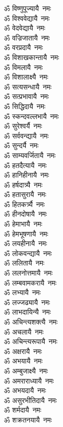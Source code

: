 \begin{flushleft}
\begin{multicols}{2}
ॐ विष्णुपूज्यायै~नमः\\
ॐ विश्ववेद्यायै~नमः\\
ॐ वेदवेद्यायै~नमः\\
ॐ वज्रिजातायै~नमः\\
ॐ वरप्रदायै~नमः\\
ॐ विशाखकान्तायै~नमः\\
ॐ विमलायै~नमः\\
ॐ विशालाक्ष्यै~नमः\\
ॐ सत्यसन्धायै~नमः\\
ॐ सत्प्रभावायै~नमः\hfill{}\\
ॐ सिद्धिदायै~नमः\\
ॐ स्कन्दवल्लभायै~नमः\\
ॐ सुरेश्वर्यै~नमः\\
ॐ सर्ववन्द्यायै~नमः\\
ॐ सुन्दर्यै~नमः\\
ॐ साम्यवर्जितायै~नमः\\
ॐ हतदैत्यायै~नमः\\
ॐ हानिहीनायै~नमः\\
ॐ हर्षदात्र्यै~नमः\\
ॐ हतासुरायै~नमः\hfill{}\\
ॐ हितकर्त्र्यै~नमः\\
ॐ हीनदोषायै~नमः\\
ॐ हेमाभायै~नमः\\
ॐ हेमभूषणायै~नमः\\
ॐ लयहीनायै~नमः\\
ॐ लोकवन्द्यायै~नमः\\
ॐ ललितायै~नमः\\
ॐ ललनोत्तमायै~नमः\\
ॐ लम्बवामकरायै~नमः\\
ॐ लभ्यायै~नमः\hfill{}\\
ॐ लज्जढ्यायै~नमः\\
ॐ लाभदायिन्यै~नमः\\
ॐ अचिन्त्यशक्त्यै~नमः\\
ॐ अचलायै~नमः\\
ॐ अचिन्त्यरूपायै~नमः\\
ॐ अक्षरायै~नमः\\
ॐ अभयायै~नमः\\
ॐ अम्बुजाक्ष्यै~नमः\\
ॐ अमराराध्यायै~नमः\\
ॐ अभयदायै~नमः\hfill{}\\
ॐ असुरभीतिदायै~नमः\\
ॐ शर्मदायै~नमः\\
ॐ शक्रतनयायै~नमः\\

\end{multicols}
\end{flushleft}
